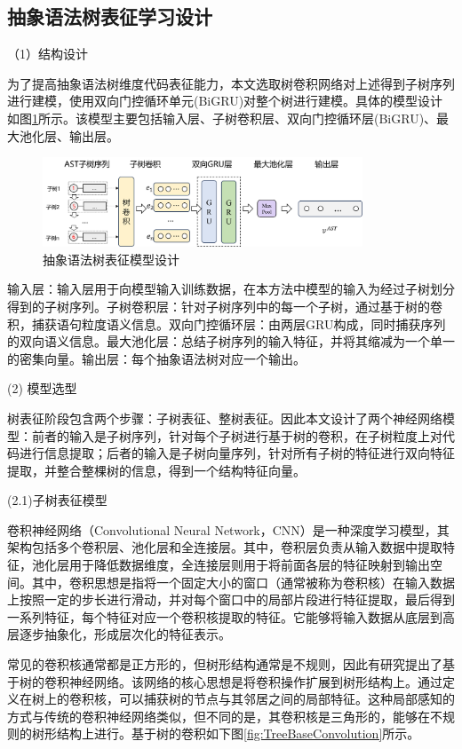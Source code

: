 \subsection{抽象语法树表征学习设计}
\label{subsec:ASTModel}
（1）结构设计

为了提高抽象语法树维度代码表征能力，本文选取树卷积网络对上述得到子树序列进行建模，使用双向门控循环单元(BiGRU)对整个树进行建模。具体的模型设计如图\ref{fig:astmodel}所示。该模型主要包括输入层、子树卷积层、双向门控循环层(BiGRU)、最大池化层、输出层。
\begin{figure}[H]
  \centering
  \includegraphics[width=0.85\textwidth]{figures/astmodel.png}
  \caption{抽象语法树表征模型设计}\label{fig:astmodel}
\end{figure}

输入层：输入层用于向模型输入训练数据，在本方法中模型的输入为经过子树划分得到的子树序列。子树卷积层：针对子树序列中的每一个子树，通过基于树的卷积，捕获语句粒度语义信息。双向门控循环层：由两层GRU构成，同时捕获序列的双向语义信息。最大池化层：总结子树序列的输入特征，并将其缩减为一个单一的密集向量。输出层：每个抽象语法树对应一个输出。

(2) 模型选型

树表征阶段包含两个步骤：子树表征、整树表征。因此本文设计了两个神经网络模型：前者的输入是子树序列，针对每个子树进行基于树的卷积，在子树粒度上对代码进行信息提取；后者的输入是子树向量序列，针对所有子树的特征进行双向特征提取，并整合整棵树的信息，得到一个结构特征向量。

(2.1)子树表征模型

卷积神经网络（Convolutional Neural Network，CNN）是一种深度学习模型，其架构包括多个卷积层、池化层和全连接层。其中，卷积层负责从输入数据中提取特征，池化层用于降低数据维度，全连接层则用于将前面各层的特征映射到输出空间。其中，卷积思想是指将一个固定大小的窗口（通常被称为卷积核）在输入数据上按照一定的步长进行滑动，并对每个窗口中的局部片段进行特征提取，最后得到一系列特征，每个特征对应一个卷积核提取的特征。它能够将输入数据从底层到高层逐步抽象化，形成层次化的特征表示。

常见的卷积核通常都是正方形的，但树形结构通常是不规则，因此有研究\cite{8813290}提出了基于树的卷积神经网络。该网络的核心思想是将卷积操作扩展到树形结构上。通过定义在树上的卷积核，可以捕获树的节点与其邻居之间的局部特征。这种局部感知的方式与传统的卷积神经网络类似，但不同的是，其卷积核是三角形的，能够在不规则的树形结构上进行。基于树的卷积如下图\ref{fig:TreeBaseConvolution}所示。

